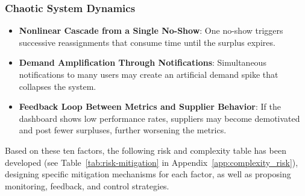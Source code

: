 \documentclass[conference]{IEEEtran}
\begin{document}
\subsubsection{Chaotic System Dynamics}

\begin{itemize}
    \item \textbf{Nonlinear Cascade from a Single No-Show}: One no-show triggers successive reassignments that consume time until the surplus expires.
    \item \textbf{Demand Amplification Through Notifications}: Simultaneous notifications to many users may create an artificial demand spike that collapses the system.
    \item \textbf{Feedback Loop Between Metrics and Supplier Behavior}: If the dashboard shows low performance rates, suppliers may become demotivated and post fewer surpluses, further worsening the metrics.
\end{itemize}

Based on these ten factors, the following risk and complexity table has been developed (see Table~\ref{tab:risk-mitigation} in Appendix~\ref{app:complexity_risk}), designing specific mitigation mechanisms for each factor, as well as proposing monitoring, feedback, and control strategies.
\end{document}
